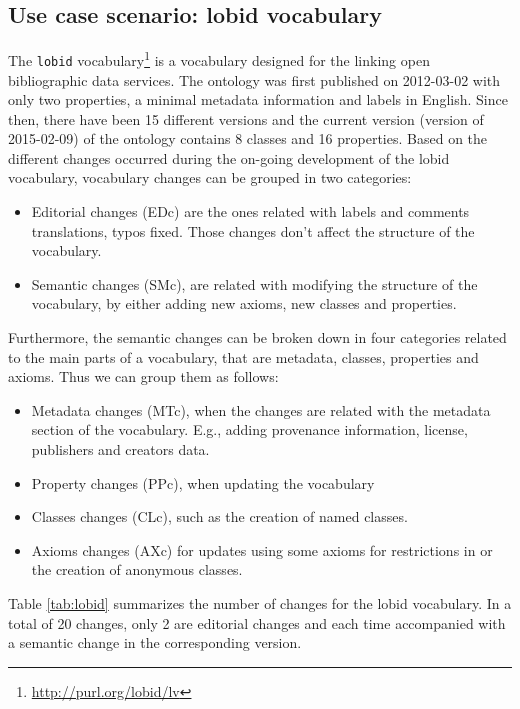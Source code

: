 \subsection{Use case scenario: lobid vocabulary}
\label{lobid vocabulary}
The \texttt{lobid} vocabulary\footnote{\url{http://purl.org/lobid/lv}} is a vocabulary designed for the  linking open bibliographic data services. The ontology was first published on 2012-03-02 with only two properties, a minimal metadata information and labels in English. Since then, there have been 15 different versions and the current version (version of 2015-02-09) of the ontology contains 8 classes and 16 properties. Based on the different changes occurred during the on-going development of the lobid vocabulary, vocabulary changes can be grouped in two categories:
\begin{itemize}
\item Editorial changes (EDc) are the ones related with labels and comments translations, typos fixed. Those changes don't affect the structure of the vocabulary.
\item Semantic changes (SMc), are related with modifying the structure of the vocabulary, by either adding new axioms, new classes and properties.
\end{itemize}

Furthermore, the semantic changes can be broken down in four categories related to the main parts of a vocabulary, that are metadata, classes, properties and axioms. Thus we can group them as follows:

\begin{itemize}
\item Metadata changes (MTc), when the changes are related with the metadata section of the vocabulary. E.g., adding provenance information, license, publishers and creators data.
\item Property changes (PPc), when updating the vocabulary 
\item Classes changes (CLc), such as the creation of named classes.
\item Axioms changes (AXc) for updates using some axioms for restrictions in or the creation of anonymous classes. 

\end{itemize}

Table \ref{tab:lobid} summarizes the number of changes for the lobid vocabulary. In  a total of 20 changes, only 2 are editorial changes and each time accompanied with a semantic change in the corresponding version.

\begin{table}[!htb]
\end{table}
